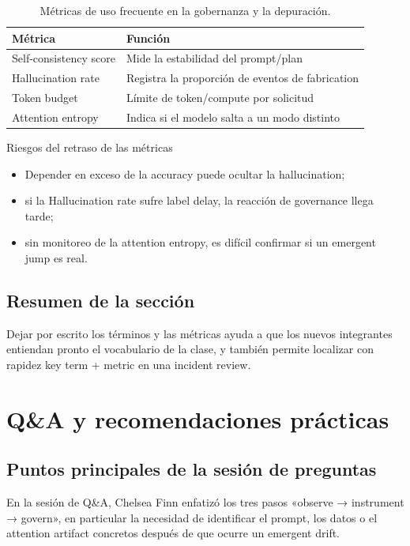 \documentclass[a4paper]{article}
\begin{document}
\begin{table}[H]
\centering
\begin{tabular}{p{4cm}p{5cm}}
\toprule
Métrica & Función \\
\midrule
Self-consistency score & Mide la estabilidad del prompt/plan \\
Hallucination rate & Registra la proporción de eventos de fabrication \\
Token budget & Límite de token/compute por solicitud \\
Attention entropy & Indica si el modelo salta a un modo distinto \\
\bottomrule
\end{tabular}
\caption{Métricas de uso frecuente en la gobernanza y la depuración.}
\end{table}

\begin{warningbox}{Riesgos del retraso de las métricas}
\begin{itemize}
    \item Depender en exceso de la accuracy puede ocultar la hallucination;
    \item si la Hallucination rate sufre label delay, la reacción de governance llega tarde;
    \item sin monitoreo de la attention entropy, es difícil confirmar si un emergent jump es real.
\end{itemize}
\end{warningbox}

\subsection{Resumen de la sección}

Dejar por escrito los términos y las métricas ayuda a que los nuevos integrantes entiendan pronto el vocabulario de la clase, y también permite localizar con rapidez key term + metric en una incident review.
\section{Q\&A y recomendaciones prácticas}

\subsection{Puntos principales de la sesión de preguntas}

En la sesión de Q\&A, Chelsea Finn enfatizó los tres pasos «observe → instrument → govern», en particular la necesidad de identificar el prompt, los datos o el attention artifact concretos después de que ocurre un emergent drift.
\end{document}
